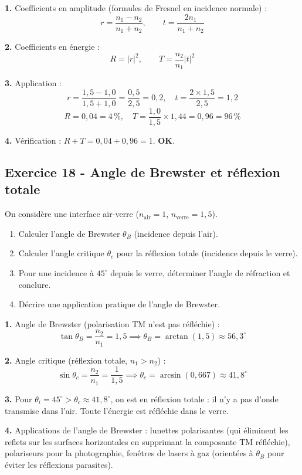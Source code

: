 \documentclass[12pt,a4paper]{article}
\begin{document}
\begin{boitecorrige}
\textbf{1.} Coefficients en amplitude (formules de Fresnel en incidence normale) :
\[
r = \frac{n_1 - n_2}{n_1 + n_2}, \qquad t = \frac{2n_1}{n_1 + n_2}
\]

\textbf{2.} Coefficients en énergie :
\[
R = |r|^2, \qquad T = \frac{n_2}{n_1}|t|^2
\]

\textbf{3.} Application :
\[
r = \frac{1{,}5 - 1{,}0}{1{,}5 + 1{,}0} = \frac{0{,}5}{2{,}5} = 0{,}2, \quad t = \frac{2\times 1{,}5}{2{,}5} = 1{,}2
\]
\[
R = 0{,}04 = 4\,\%, \quad T = \frac{1{,}0}{1{,}5}\times 1{,}44 = 0{,}96 = 96\,\%
\]

\textbf{4.} Vérification : $R + T = 0{,}04 + 0{,}96 = 1$. \textbf{OK}.
\end{boitecorrige}

\subsection*{Exercice 18 - Angle de Brewster et réflexion totale \niveau{\difficile}}

\begin{boiteexercice}
On considère une interface air-verre ($n_\text{air} = 1$, $n_\text{verre} = 1{,}5$).
\begin{enumerate}
  \item Calculer l'angle de Brewster $\theta_B$ (incidence depuis l'air).
  \item Calculer l'angle critique $\theta_c$ pour la réflexion totale (incidence depuis le verre).
  \item Pour une incidence à $45^\circ$ depuis le verre, déterminer l'angle de réfraction et conclure.
  \item Décrire une application pratique de l'angle de Brewster.
\end{enumerate}
\end{boiteexercice}

\begin{boitecorrige}
\textbf{1.} Angle de Brewster (polarisation TM n'est pas réfléchie) :
\[
\tan\theta_B = \frac{n_2}{n_1} = 1{,}5 \implies \theta_B = \arctan(1{,}5) \approx 56{,}3^\circ
\]

\textbf{2.} Angle critique (réflexion totale, $n_1 > n_2$) :
\[
\sin\theta_c = \frac{n_2}{n_1} = \frac{1}{1{,}5} \implies \theta_c = \arcsin(0{,}667) \approx 41{,}8^\circ
\]

\textbf{3.} Pour $\theta_i = 45^\circ > \theta_c \approx 41{,}8^\circ$, on est en réflexion totale : il n'y a pas d'onde transmise dans l'air. Toute l'énergie est réfléchie dans le verre.

\textbf{4.} Applications de l'angle de Brewster : lunettes polarisantes (qui éliminent les reflets sur les surfaces horizontales en supprimant la composante TM réfléchie), polariseurs pour la photographie, fenêtres de lasers à gaz (orientées à $\theta_B$ pour éviter les réflexions parasites).
\end{boitecorrige}
\end{document}
